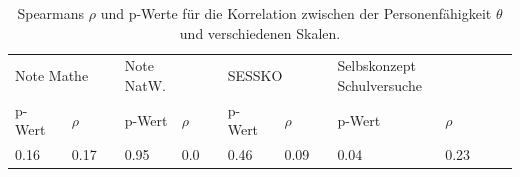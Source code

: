 \begin{table}[htbp]
  \centering
\begin{tabular}{@{}lllllllllll@{}}
\toprule
   \multicolumn{2}{l}{Note Mathe} &&  \multicolumn{2}{l}{Note NatW.}&&  \multicolumn{2}{l}{SESSKO}&&  \multicolumn{2}{l}{Selbskonzept Schulversuche}\\ 
      \cmidrule{1-2}\cmidrule{4-5}\cmidrule{7-8}\cmidrule{10-11}
   p-Wert & $\rho$ && p-Wert & $\rho$  && p-Wert & $\rho$&& p-Wert & $\rho$\\ 
\midrule
   0.16 & 0.17 && 0.95 & 0.0 && 0.46 & 0.09 && 0.04 & 0.23    \\ 

\bottomrule
\end{tabular} 
  \caption{Spearmans $\rho$ und p-Werte für die Korrelation zwischen der Personenfähigkeit $\theta$ und verschiedenen Skalen.  }
  \label{tab:CorPersonRasch}
\end{table}

